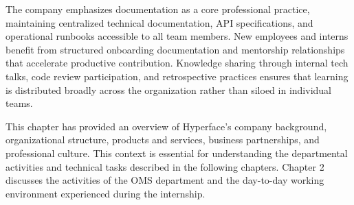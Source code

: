 The company emphasizes documentation as a core professional practice, maintaining centralized technical documentation, API specifications, and operational runbooks accessible to all team members. New employees and interns benefit from structured onboarding documentation and mentorship relationships that accelerate productive contribution. Knowledge sharing through internal tech talks, code review participation, and retrospective practices ensures that learning is distributed broadly across the organization rather than siloed in individual teams.

This chapter has provided an overview of Hyperface's company background, organizational structure, products and services, business partnerships, and professional culture. This context is essential for understanding the departmental activities and technical tasks described in the following chapters. Chapter 2 discusses the activities of the OMS department and the day-to-day working environment experienced during the internship.
